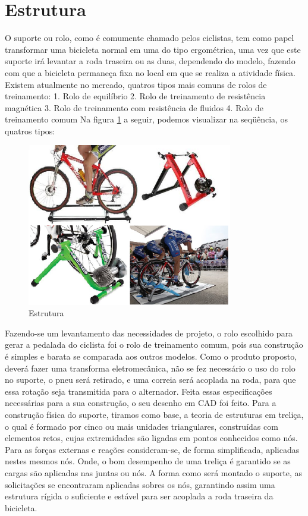 \section{Estrutura} \label{Secao Estrutura}

O suporte ou rolo, como é comumente chamado pelos ciclistas, tem como papel transformar uma bicicleta normal em uma do tipo ergométrica, uma vez que este suporte irá levantar a roda traseira ou as duas, dependendo do modelo, fazendo com que a bicicleta permaneça fixa no local em que se realiza a atividade física.  Existem atualmente no mercado, quatros tipos mais comuns de rolos de treinamento:
1.	Rolo de equilíbrio
2.	Rolo de treinamento de resistência magnética
3.	Rolo de treinamento com resistência de fluidos
4.	Rolo de treinamento comum
Na figura \ref{fig:rolos} a seguir, podemos visualizar na seqüência, os quatros tipos:

\begin{figure}[h]
    \centering
    \includegraphics[width=0.8\textwidth]{figuras/rolos.png}
    \caption{Estrutura}
    \label{fig:rolos}
\end{figure}

Fazendo-se um levantamento das necessidades de projeto, o rolo escolhido para gerar a pedalada do ciclista foi o rolo de treinamento comum, pois sua construção é simples e barata se comparada aos outros modelos. 
Como o produto proposto, deverá fazer uma transforma eletromecânica, não se fez necessário o uso do rolo no suporte,  o pneu será retirado, e uma correia será acoplada na roda, para que essa rotação seja transmitida para o alternador. Feita essas especificações necessárias para a sua construção, o seu desenho em CAD foi feito. 
Para a construção física do suporte, tiramos como base, a teoria de estruturas em treliça, o qual é formado por cinco ou mais unidades triangulares, construídas com elementos retos, cujas extremidades são ligadas em pontos conhecidos como nós. Para as forças externas e reações consideram-se, de forma simplificada, aplicadas nestes mesmos nós. Onde, o bom desempenho de uma treliça é garantido se as cargas são aplicadas nas juntas ou nós. A forma como será montado o suporte, as solicitações se encontraram aplicadas sobres os nós, garantindo assim uma estrutura rígida o suficiente e estável para ser acoplada a roda traseira da bicicleta.

